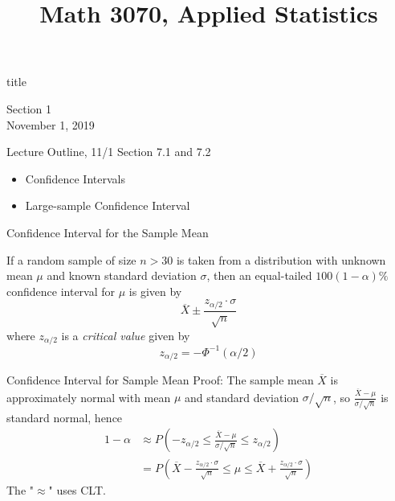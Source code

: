 \documentclass[t,handout]{beamer}
\title{Math 3070, Applied Statistics}
\newcommand{\nl}[1]{\vspace{#1 em}}
\begin{document}
\begin{frame}[c]
    \begin{beamercolorbox}[rounded=true,wd=\textwidth,center]{title}
        \inserttitle
    \end{beamercolorbox}
    \begin{center}
        Section 1\\
        \nl{0.5}
        November 1, 2019
    \end{center}
\end{frame}
\begin{frame}[c]{Lecture Outline, 11/1}
    Section 7.1 and 7.2
    \begin{itemize}
        \item Confidence Intervals 
        \item Large-sample Confidence Interval
    \end{itemize}
\end{frame}

\begin{frame}{Confidence Interval for the Sample Mean}
    \begin{block}{}
    If a random sample of size $n>30$ is taken from a distribution with unknown mean $\mu$ and known standard deviation $\sigma$, then an equal-tailed $100(1-\alpha)\%$ confidence interval for $\mu$ is given by
    $$\overline X \pm \frac{z_{\alpha/2}\cdot\sigma}{\sqrt n}$$
    where $z_{\alpha/2}$ is a \emph{critical value} given by
    $$z_{\alpha/2} = -\Phi^{-1}(\alpha/2)$$
    \end{block}
\end{frame}
\begin{frame}{Confidence Interval for Sample Mean}
    Proof: The sample mean $\overline{X}$ is approximately normal with mean $\mu$ and standard deviation $\sigma/\sqrt{n}$, so $\frac{\overline{X}-\mu}{\sigma/\sqrt n}$ is standard normal, hence
    \small\begin{align*}
    1-\alpha &\approx P\left(-z_{\alpha/2} \leq \frac{\overline X-\mu}{\sigma/\sqrt n} \leq z_{\alpha/2}\right) \\
    &= P\left(\overline X-\frac{z_{\alpha/2}\cdot\sigma}{\sqrt n} \leq \mu \leq \overline X+\frac{z_{\alpha/2}\cdot\sigma}{\sqrt n}\right) 
    \end{align*}
    The "$\approx$" uses CLT.
\end{frame}
\end{document}
